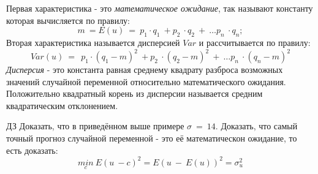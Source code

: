 \documentclass[12pt,a4paper]{article}
\begin{document}
\begin{center}
Первая характеристика - это \textit{математическое ожидание}, так называют константу которая вычисляется по правилу:
\begin{equation*}
m\ =E( u) \ =\ p_{1} \cdot q_{1} \ +p_{2} \ \cdot q_{2} \ +\ \dotsc p_{n} \ \cdot q_{n} ;
\end{equation*}
Вторая характеристика называется дисперсией $\displaystyle Var$ и рассчитывается по правилу:
\begin{equation*}
Var( u) \ =\ \ p_{1} \cdot ( q_{1} -m)^{2} \ +p_{2} \ \cdot ( q_{2} -m)^{2} \ +\ \dotsc p_{n} \ \cdot ( q_{n} -m)^{2}
\end{equation*}
\textit{Дисперсия} - это константа равная среднему квадрату разброса возможных значений случайной переменной относительно математического ожидания. Положительно квадратный корень из дисперсии называется средним квадратическим отклонением.

$\displaystyle \boxed{\text{ДЗ}}$ Доказать, что в приведённом выше примере $\displaystyle \sigma \ =\ 14$. Доказать, что самый точный прогноз случайной переменной - это её математическон ожидание, то есть доказать:
\begin{equation*}
\underset{c}{min} \ E( u\ -c)^{2} =E( u\ -\ E( u))^{2} =\sigma ^{2}_{u}
\end{equation*}

\begin{figure}[H]
  \begin{center}

\end{center}
\end{figure}
\end{center}
\end{document}
